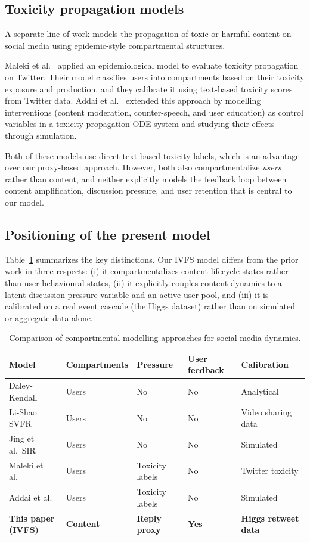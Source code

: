 \documentclass[11pt]{article}
\begin{document}
\subsection{Toxicity propagation models}

A separate line of work models the propagation of toxic or harmful content on social media using epidemic-style compartmental structures.

Maleki et al.\ \cite{maleki2022} applied an epidemiological model to evaluate toxicity propagation on Twitter. Their model classifies users into compartments based on their toxicity exposure and production, and they calibrate it using text-based toxicity scores from Twitter data. Addai et al.\ \cite{addai2025} extended this approach by modelling interventions (content moderation, counter-speech, and user education) as control variables in a toxicity-propagation ODE system and studying their effects through simulation.

Both of these models use direct text-based toxicity labels, which is an advantage over our proxy-based approach. However, both also compartmentalize \emph{users} rather than content, and neither explicitly models the feedback loop between content amplification, discussion pressure, and user retention that is central to our model.

\subsection{Positioning of the present model}

Table~\ref{tab:lit} summarizes the key distinctions. Our IVFS model differs from the prior work in three respects: (i) it compartmentalizes content lifecycle states rather than user behavioural states, (ii) it explicitly couples content dynamics to a latent discussion-pressure variable and an active-user pool, and (iii) it is calibrated on a real event cascade (the Higgs dataset) rather than on simulated or aggregate data alone.

\begin{table}[htbp]
\centering
\caption{Comparison of compartmental modelling approaches for social media dynamics.}
\label{tab:lit}
\begin{tabular}{p{3.2cm} p{2.2cm} p{2cm} p{2.4cm} p{3.2cm}}
\toprule
Model & Compartments & Pressure & User feedback & Calibration \\
\midrule
Daley-Kendall \cite{daleyKendall1964} & Users & No & No & Analytical \\
Li-Shao SVFR \cite{liShao2024} & Users & No & No & Video sharing data \\
Jing et al.\ SIR \cite{jing2018} & Users & No & No & Simulated \\
Maleki et al.\ \cite{maleki2022} & Users & Toxicity labels & No & Twitter toxicity \\
Addai et al.\ \cite{addai2025} & Users & Toxicity labels & No & Simulated \\
\textbf{This paper (IVFS)} & \textbf{Content} & \textbf{Reply proxy} & \textbf{Yes} & \textbf{Higgs retweet data} \\
\bottomrule
\end{tabular}
\end{table}
\end{document}
